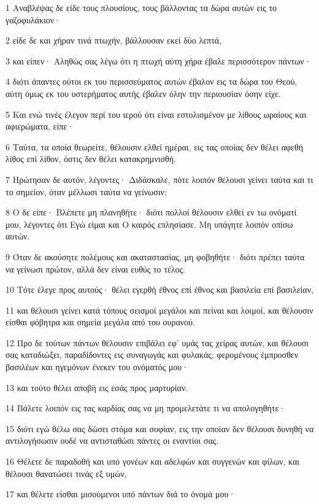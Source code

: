 \par 1 Αναβλέψας δε είδε τους πλουσίους, τους βάλλοντας τα δώρα αυτών εις το γαζοφυλάκιον·
\par 2 είδε δε και χήραν τινά πτωχήν, βάλλουσαν εκεί δύο λεπτά,
\par 3 και είπεν· Αληθώς σας λέγω ότι η πτωχή αύτη χήρα έβαλε περισσότερον πάντων·
\par 4 διότι άπαντες ούτοι εκ του περισσεύματος αυτών έβαλον εις τα δώρα του Θεού, αύτη όμως εκ του υστερήματος αυτής έβαλεν όλην την περιουσίαν όσην είχε.
\par 5 Και ενώ τινές έλεγον περί του ιερού ότι είναι εστολισμένον με λίθους ωραίους και αφιερώματα, είπε·
\par 6 Ταύτα, τα οποία θεωρείτε, θέλουσιν ελθεί ημέραι, εις τας οποίας δεν θέλει αφεθή λίθος επί λίθον, όστις δεν θέλει κατακρημνισθή.
\par 7 Ηρώτησαν δε αυτόν, λέγοντες· Διδάσκαλε, πότε λοιπόν θέλουσι γείνει ταύτα και τι το σημείον, όταν μέλλωσι ταύτα να γείνωσιν;
\par 8 Ο δε είπε· Βλέπετε μη πλανηθήτε· διότι πολλοί θέλουσιν ελθεί εν τω ονόματί μου, λέγοντες ότι Εγώ είμαι και Ο καιρός επλησίασε. Μη υπάγητε λοιπόν οπίσω αυτών.
\par 9 Όταν δε ακούσητε πολέμους και ακαταστασίας, μη φοβηθήτε· διότι πρέπει ταύτα να γείνωσι πρώτον, αλλά δεν είναι ευθύς το τέλος.
\par 10 Τότε έλεγε προς αυτούς· θέλει εγερθή έθνος επί έθνος και βασιλεία επί βασιλείαν,
\par 11 και θέλουσι γείνει κατά τόπους σεισμοί μεγάλοι και πείναι και λοιμοί, και θέλουσιν είσθαι φόβητρα και σημεία μεγάλα από του ουρανού.
\par 12 Προ δε τούτων πάντων θέλουσιν επιβάλει εφ' υμάς τας χείρας αυτών, και θέλουσι σας καταδιώξει, παραδίδοντες εις συναγωγάς και φυλακάς, φερομένους έμπροσθεν βασιλέων και ηγεμόνων ένεκεν του ονόματός μου·
\par 13 και τούτο θέλει αποβή εις εσάς προς μαρτυρίαν.
\par 14 Βάλετε λοιπόν εις τας καρδίας σας να μη προμελετάτε τι να απολογηθήτε·
\par 15 διότι εγώ θέλω σας δώσει στόμα και σοφίαν, εις την οποίαν δεν θέλουσι δυνηθή να αντιλογήσωσιν ουδέ να αντισταθώσι πάντες οι εναντίοι σας.
\par 16 Θέλετε δε παραδοθή και υπό γονέων και αδελφών και συγγενών και φίλων, και θέλουσι θανατώσει τινάς εξ υμών,
\par 17 και θέλετε είσθαι μισούμενοι υπό πάντων διά το όνομά μου·
